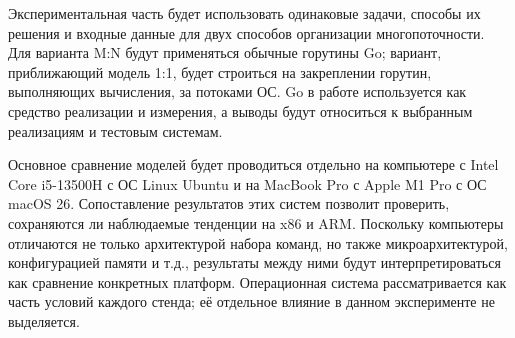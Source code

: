 Экспериментальная часть будет использовать одинаковые задачи, способы их решения и входные данные
  для двух способов организации многопоточности. Для варианта M:N будут применяться обычные горутины
  Go; вариант, приближающий модель 1:1, будет строиться на закреплении горутин, выполняющих
  вычисления, за потоками ОС. Go в работе используется как средство реализации и измерения,
  а выводы будут относиться к выбранным реализациям и тестовым системам.

Основное сравнение моделей будет проводиться отдельно на компьютере с Intel Core i5-13500H с ОС
  Linux Ubuntu и на MacBook Pro с Apple M1 Pro с ОС macOS 26. Сопоставление результатов этих систем
  позволит проверить, сохраняются ли наблюдаемые тенденции на x86 и ARM. Поскольку компьютеры
  отличаются не только архитектурой набора команд, но также микроархитектурой, конфигурацией памяти
  и т.д., результаты между ними будут интерпретироваться как сравнение конкретных платформ.
  Операционная система рассматривается как часть условий каждого стенда; её отдельное влияние
  в данном эксперименте не выделяется.
